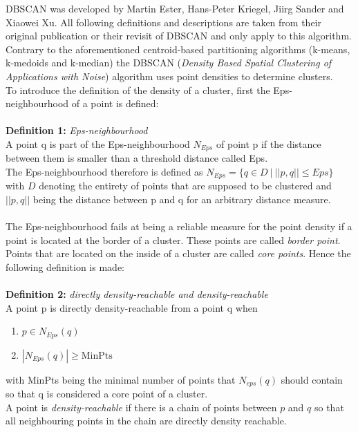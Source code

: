 \marginnote{\textcolor{cyan}{Niklas Conen}}
DBSCAN was developed by Martin Ester, Hans-Peter Kriegel, Jiirg Sander and Xiaowei Xu. All following definitions and descriptions are taken from their original publication \cite{dbscan} or their revisit of DBSCAN \cite{dbscanrevisited} and only apply to this algorithm.\\
Contrary to the aforementioned centroid-based partitioning algorithms (k-means, k-medoids and k-median) the DBSCAN (\textit{Density Based Spatial Clustering of Applications with Noise}) algorithm uses point densities to determine clusters.\\
To introduce the definition of the density of a cluster, first the Eps-neighbourhood of a point is defined:\\
\ \\
\textbf{Definition 1:} \textit{Eps-neighbourhood}\\
A point q is part of the Eps-neighbourhood $N_{Eps}$ of point p if the distance between them is smaller than a threshold distance called Eps.\\
The Eps-neighbourhood therefore is defined as $N_{Eps} = \{q \in D \ | \ ||p, q|| \leq Eps \}$ with $D$ denoting the entirety of points that are supposed to be clustered and $||p, q||$ being the distance between p and q for an arbitrary distance measure.\\
\ \\
The Eps-neighbourhood fails at being a reliable measure for the point density if a point is located at the border of a cluster. These points are called \textit{border point}. Points that are located on the inside of a cluster are called \textit{core points}. Hence the following definition is made:\\
\ \\
\textbf{Definition 2:} \textit{directly density-reachable and density-reachable}\\
A point p is directly density-reachable from a point q when
\begin{enumerate}
    \item $p \in N_{Eps}(q)$
    \item $|N_{Eps}(q)| \geq \text{MinPts}$
\end{enumerate}
with MinPts being the minimal number of points that $N_{eps}(q)$ should contain so that q is considered a core point of a cluster.\\
A point is \textit{density-reachable} if there is a chain of points between $p$ and $q$ so that all neighbouring points in the chain are directly density reachable.\\
